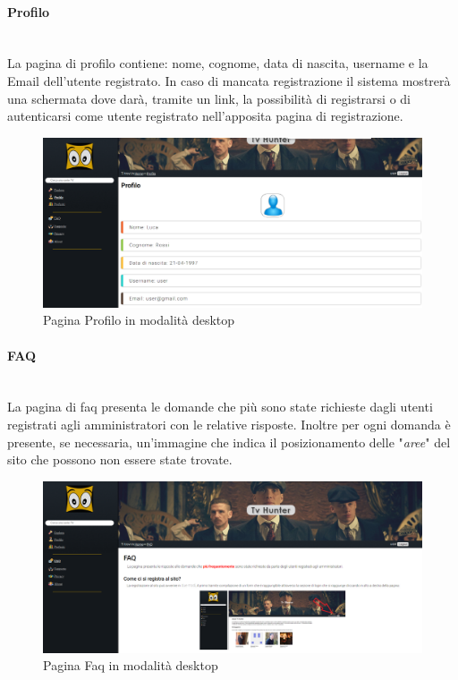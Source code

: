 \paragraph{Profilo}
~\\
La pagina di profilo contiene: nome, cognome, data di nascita, username e la Email dell'utente registrato. In caso di mancata registrazione il sistema mostrerà una schermata dove darà, tramite un link, la possibilità di registrarsi o di autenticarsi come utente registrato nell'apposita pagina di registrazione. 
\begin{figure}[H]
	\centerline{\includegraphics[scale= 0.33]{img/profilo.png}}
	\caption{Pagina Profilo in modalità desktop}
\end{figure}


\paragraph{FAQ} 
~\\
La pagina di faq presenta le domande che più sono state richieste dagli utenti registrati agli amministratori con le relative risposte. Inoltre per ogni domanda è presente, se necessaria, un'immagine che indica il posizionamento delle "\textit{aree}" del sito che possono non essere state trovate.
\begin{figure}[H]
	\centerline{\includegraphics[scale= 0.33]{img/faq.png}}
	\caption{Pagina Faq in modalità desktop}
	
\end{figure}


